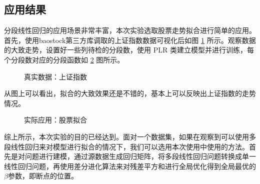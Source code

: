 \subsection{应用结果}

分段线性回归的应用场景非常丰富，本次实验选取股票走势拟合进行简单的应用。首先，使用baostock第三方库调取的上证指数数据可视化后如图 \ref{app1} 所示。观察数据的大致走势，设置好一些列待检的分段数，使用 PLR 类建立模型并进行训练，每个分段数对应的分段函数如 \ref{app2} 图所示。

\begin{figure}[H]
    \caption{真实数据：上证指数}
    \label{app1}      
\end{figure}

从图上可以看出，拟合的大致效果还是不错的，基本上可以反映出上证指数的走势情况。

\begin{figure}[H]
    \caption{实际应用：股票拟合}
    \label{app2}      
\end{figure}


综上所示，本次实验的目的已经达到。面对一个数据集，如果在观察到可以使用多段线性回归来对模型进行拟合的情况下，我们可以选用本次使用中使用的方法。首先是对问题进行建模，通过源数据生成回归矩阵，将多段线性回归问题转换成单一线性回归问题，再使用差分进化算法来对残差平方和进行全局优化得到全局最优的$\beta$参数，即断点的位置。